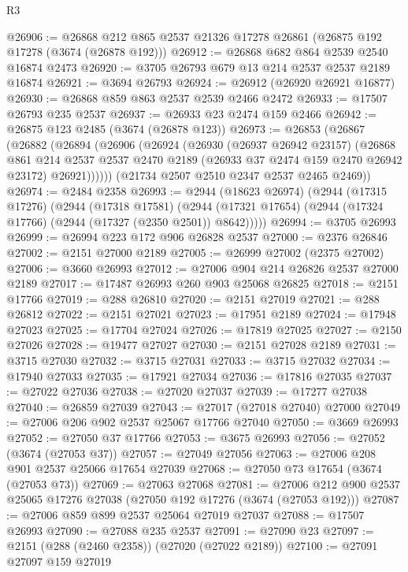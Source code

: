 \begin{lexlean}{R3}
\begin{coremodule}
@26906 := @26868 @212 @865 @2537 @21326 @17278 @26861 (@26875 @192 @17278 (@3674 (@26878 @192)))
@26912 := @26868 @682 @864 @2539 @2540 @16874 @2473
@26920 := @3705 @26793 @679 @13 @214 @2537 @2537 @2189 @16874
@26921 := @3694 @26793
@26924 := @26912 (@26920 @26921 @16877)
@26930 := @26868 @859 @863 @2537 @2539 @2466 @2472
@26933 := @17507 @26793 @235 @2537
@26937 := @26933 @23 @2474 @159 @2466
@26942 := @26875 @123 @2485 (@3674 (@26878 @123))
@26973 := @26853
    (@26867
      (@26882
        (@26894
          (@26906
            (@26924
              (@26930
                (@26937 @26942 @23157)
                (@26868
                  @861
                  @214
                  @2537
                  @2537
                  @2470
                  @2189
                  (@26933 @37 @2474 @159 @2470 @26942 @23172)
                  @26921))))))
      (@21734 @2507 @2510 @2347 @2537 @2465 @2469))
@26974 := @2484 @2358
@26993 := @2944
    (@18623 @26974)
    (@2944
      (@17315 @17276)
      (@2944
        (@17318 @17581)
        (@2944 (@17321 @17654) (@2944 (@17324 @17766) (@2944 (@17327 (@2350 @2501)) @8642)))))
@26994 := @3705 @26993
@26999 := @26994 @223 @172 @906 @26828 @2537
@27000 := @2376 @26846
@27002 := @2151 @27000 @2189
@27005 := @26999 @27002 (@2375 @27002)
@27006 := @3660 @26993
@27012 := @27006 @904 @214 @26826 @2537 @27000 @2189
@27017 := @17487 @26993 @260 @903 @25068 @26825
@27018 := @2151 @17766
@27019 := @288 @26810
@27020 := @2151 @27019
@27021 := @288 @26812
@27022 := @2151 @27021
@27023 := @17951 @2189
@27024 := @17948 @27023
@27025 := @17704 @27024
@27026 := @17819 @27025
@27027 := @2150 @27026
@27028 := @19477 @27027
@27030 := @2151 @27028 @2189
@27031 := @3715 @27030
@27032 := @3715 @27031
@27033 := @3715 @27032
@27034 := @17940 @27033
@27035 := @17921 @27034
@27036 := @17816 @27035
@27037 := @27022 @27036
@27038 := @27020 @27037
@27039 := @17277 @27038
@27040 := @26859 @27039
@27043 := @27017 (@27018 @27040) @27000
@27049 := @27006 @206 @902 @2537 @25067 @17766 @27040
@27050 := @3669 @26993
@27052 := @27050 @37 @17766
@27053 := @3675 @26993
@27056 := @27052 (@3674 (@27053 @37))
@27057 := @27049 @27056
@27063 := @27006 @208 @901 @2537 @25066 @17654 @27039
@27068 := @27050 @73 @17654 (@3674 (@27053 @73))
@27069 := @27063 @27068
@27081 := @27006 @212 @900 @2537 @25065 @17276 @27038 (@27050 @192 @17276 (@3674 (@27053 @192)))
@27087 := @27006 @859 @899 @2537 @25064 @27019 @27037
@27088 := @17507 @26993
@27090 := @27088 @235 @2537
@27091 := @27090 @23
@27097 := @2151 (@288 (@2460 @2358)) (@27020 (@27022 @2189))
@27100 := @27091 @27097 @159 @27019

\end{coremodule}
\end{lexlean}
